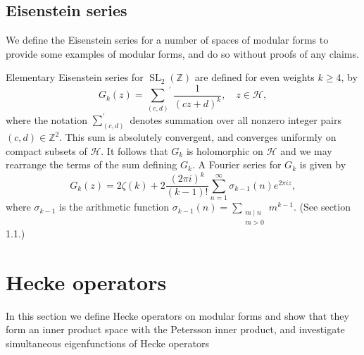 \documentclass[10pt,leqno,twoside]{article}
\theoremstyle{plain}
\theoremstyle{definition}
\numberwithin{equation}{section}
\numberwithin{lem}{section}
\newcommand{\textib}[1]{\textbf{\textit{#1\index{#1}}}} %
\DeclareMathOperator{\SL}{SL}
\newcommand{\slz}{\SL_2(\mathbb{Z})}
\newcommand{\tbd}{{\Huge\color{red}{\textib{TBD}}}}
\begin{document}
\subsection{Eisenstein series}
We define the Eisenstein series for a number of spaces of modular forms to provide some examples of modular forms, and do so without proofs of any claims.

Elementary Eisenstein series for $\slz$ are defined for even weights $k\geq 4$, by \[G_k(z) = {\sum_{(c,d)}}^\prime \frac{1}{(cz+d)^k},\quad z\in\mathcal H,\] where the notation $\sum_{(c,d)}^\prime$ denotes summation over all nonzero integer pairs $(c,d)\in\mathbb Z^2$. This sum is absolutely convergent, and converges uniformly on compact subsets of $\mathcal H$. It follows that $G_k$ is holomorphic on $\mathcal H$ and we may rearrange the terms of the sum defining $G_k$. A Fourier series for $G_k$ is given by \[G_k(z) = 2\zeta(k) + 2\frac{(2\pi i)^k}{(k-1)!}\sum_{n=1}^\infty \sigma_{k-1}(n)e^{2\pi i z},\] where $\sigma_{k-1}$ is the arithmetic function $\sigma_{k-1}(n) = \sum_{\substack{m\mid n\\ m>0}}m^{k-1}$. (See \cite{diamond} section 1.1.)

\newpage\section{Hecke operators}
In this section we define Hecke operators on modular forms and show that they form an inner product space with the Petersson inner product, and investigate simultaneous eigenfunctions of Hecke operators \tbd
\end{document}
